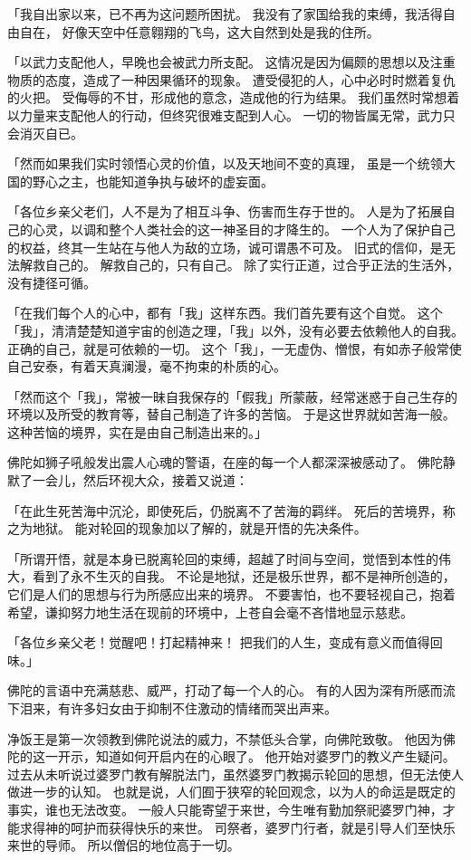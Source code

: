 \documentclass[twoside,openany]{book}
\begin{document}
「我自出家以来，已不再为这问题所困扰。
我没有了家国给我的束缚，我活得自由自在，
好像天空中任意翱翔的飞鸟，这大自然到处是我的住所。

「以武力支配他人，早晚也会被武力所支配。
这情况是因为偏颇的思想以及注重物质的态度，造成了一种因果循环的现象。
遭受侵犯的人，心中必时时燃着复仇的火把。
受侮辱的不甘，形成他的意念，造成他的行为结果。
我们虽然时常想着以力量来支配他人的行动，但终究很难支配到人心。
一切的物皆属无常，武力只会消灭自已。



「然而如果我们实时领悟心灵的价值，以及天地间不变的真理，
虽是一个统领大国的野心之主，也能知道争执与破坏的虚妄面。

「各位乡亲父老们，人不是为了相互斗争、伤害而生存于世的。
人是为了拓展自己的心灵，以调和整个人类社会的这一神圣目的才降生的。
一个人为了保护自己的权益，终其一生站在与他人为敌的立场，诚可谓愚不可及。
旧式的信仰，是无法解救自己的。
解救自己的，只有自己。
除了实行正道，过合乎正法的生活外，没有捷径可循。

「在我们每个人的心中，都有「我」这样东西。我们首先要有这个自觉。
这个「我」，清清楚楚知道宇宙的创造之理，「我」以外，没有必要去依赖他人的自我。
正确的自己，就是可依赖的一切。
这个「我」，一无虚伪、憎恨，有如赤子般常使自己安泰，有着天真澜漫，毫不拘束的朴质的心。

「然而这个「我」，常被一昧自我保存的「假我」所蒙蔽，经常迷惑于自己生存的环境以及所受的教育等，替自己制造了许多的苦恼。
于是这世界就如苦海一般。
这种苦恼的境界，实在是由自己制造出来的。」

佛陀如狮子吼般发出震人心魂的警语，在座的每一个人都深深被感动了。
佛陀静默了一会儿，然后环视大众，接着又说道：

「在此生死苦海中沉沦，即使死后，仍脱离不了苦海的羁绊。
死后的苦境界，称之为地狱。
能对轮回的现象加以了解的，就是开悟的先决条件。

「所谓开悟，就是本身已脱离轮回的束缚，超越了时间与空间，觉悟到本性的伟大，看到了永不生灭的自我。
不论是地狱，还是极乐世界，都不是神所创造的，它们是人们的思想与行为所感应出来的境界。
不要害怕，也不要轻视自己，抱着希望，谦抑努力地生活在现前的环境中，上苍自会毫不吝惜地显示慈悲。

「各位乡亲父老！觉醒吧！打起精神来！
把我们的人生，变成有意义而值得回味。」

佛陀的言语中充满慈悲、威严，打动了每一个人的心。
有的人因为深有所感而流下泪来，有许多妇女由于抑制不住激动的情绪而哭出声来。

净饭王是第一次领教到佛陀说法的威力，不禁低头合掌，向佛陀致敬。
他因为佛陀的这一开示，知道如何开启内在的心眼了。
他开始对婆罗门的教义产生疑问。
过去从未听说过婆罗门教有解脱法门，虽然婆罗门教揭示轮回的思想，但无法使人做进一步的认知。
也就是说，人们囿于狭窄的轮回观念，以为人的命运是既定的事实，谁也无法改变。
一般人只能寄望于来世，今生唯有勤加祭祀婆罗门神，才能求得神的呵护而获得快乐的来世。
司祭者，婆罗门行者，就是引导人们至快乐来世的导师。
所以僧侣的地位高于一切。
\end{document}
